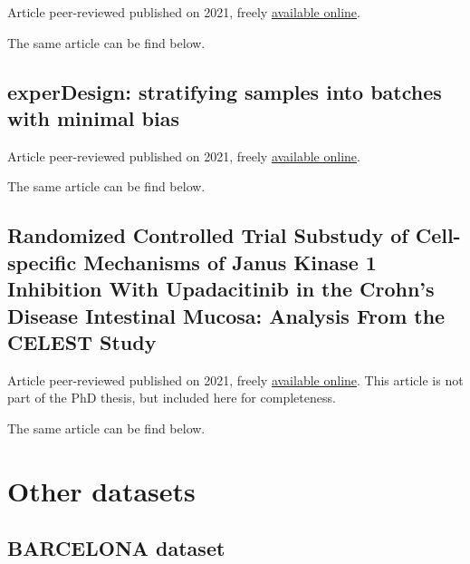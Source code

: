 \documentclass[
  12pt,
  a4paper,
  twoside,
  openright]{book}
\begin{document}
Article peer-reviewed published on 2021, freely \href{https://doi.org/10.1371/journal.pone.0246367}{available online}.

The same article can be find below.



\hypertarget{app-experDesign}{%
\section{experDesign: stratifying samples into batches with minimal bias}\label{app-experDesign}}


Article peer-reviewed published on 2021, freely \href{https://joss.theoj.org/papers/10.21105/joss.03358}{available online}.

The same article can be find below.



\hypertarget{app-upa}{%
\section{Randomized Controlled Trial Substudy of Cell-specific Mechanisms of Janus Kinase 1 Inhibition With Upadacitinib in the Crohn's Disease Intestinal Mucosa: Analysis From the CELEST Study}\label{app-upa}}


Article peer-reviewed published on 2021, freely \href{https://joss.theoj.org/papers/10.21105/joss.03358}{available online}.
This article is not part of the PhD thesis, but included here for completeness.

The same article can be find below.



\hypertarget{other-datasets}{%
\chapter{Other datasets}\label{other-datasets}}

\hypertarget{barcelona}{%
\section{BARCELONA dataset}\label{barcelona}}
\end{document}
